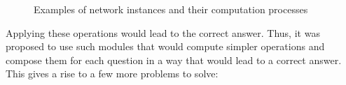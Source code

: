 \documentclass[a4paper,twocolumn]{article}
\begin{document}
\begin{figure}[h]
    \centering
    \caption{Examples of network instances and their computation processes}
\end{figure}

\noindent
Applying these operations would lead to the correct answer. Thus, it was proposed to use such modules that would compute simpler operations and compose them for each question in a way that would lead to a correct answer. This gives a rise to a few more problems to solve:
\end{document}

